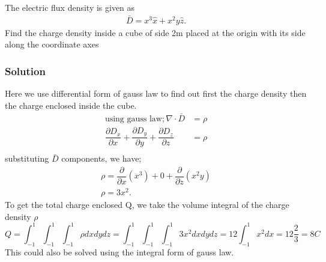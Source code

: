 \begin{example}
The electric flux density is given as
\begin{align*}
\bar{D}=x^{3}\hat{x} + x^{2}y\hat{z}.
\end{align*}
Find the charge density inside a cube of side 2m placed at the origin with its side along the coordinate axes

\subsubsection*{Solution}
Here we use differential form of gauss law to find out first the charge density then the charge enclosed inside the cube.\\
\begin{align*}
\text{using gauss law}; \nabla\cdot\bar{D}&=\rho\\
\dfrac{\partial D_{x}}{\partial x}+\dfrac{\partial D_{y}}{\partial y}+\dfrac{\partial 
D_{z}}{\partial z}&=\rho \\
\end{align*}
substituting $\bar{D}$ components, we have;
\begin{align*}
\rho= \dfrac{\partial}{\partial x}(x^{3})+ 0 +\dfrac{\partial }{\partial z}(x^{2}y)\\
\rho=3x^{2} .
\end{align*}
To get the total charge enclosed Q, we take the volume integral of the charge density $\rho$
\begin{dmath*}
Q=\int_{-1}^{1}\int_{-1}^{1}\int_{-1}^{1}\rho dxdydz
=\int_{-1}^{1}\int_{-1}^{1}\int_{-1}^{1}3x^{2}dxdydz
=12\int_{-1}^{1}x^{2}dx= 12\frac{2}{3}
= 8 C
\end{dmath*}
This could also be solved using the integral form of gauss law.
\end{example}

